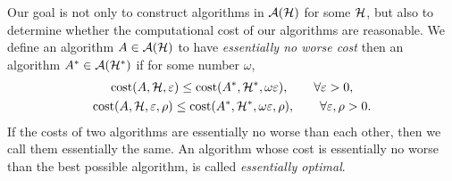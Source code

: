 \documentclass[graybox,footinfo]{svmult}
\begin{document}
Our goal is not only to construct algorithms in ${\mathcal{A}}({\mathcal{H}})$ for some ${\mathcal{H}}$, but also to determine whether the computational cost of our algorithms are reasonable.  We define an algorithm $A \in {\mathcal{A}}({\mathcal{H}})$ to have \emph{essentially no worse cost} then an algorithm $A^* \in {\mathcal{A}}({\mathcal{H}}^*)$ if for some number $\omega$,
\begin{gather}
\textup{cost}(A,{\mathcal{H}},\varepsilon) \le \textup{cost}(A^*,{\mathcal{H}}^*,\omega\varepsilon), \qquad \forall \varepsilon > 0, \\
\textup{cost}(A,{\mathcal{H}},\varepsilon,\rho) \le \textup{cost}(A^*,{\mathcal{H}}^*,\omega\varepsilon,\rho), \qquad \forall \varepsilon,\rho > 0.
\end{gather}
If the costs of two algorithms are essentially no worse than each other, then we call them essentially the same.  An algorithm whose cost is essentially no worse than the best possible algorithm, is called \emph{essentially optimal}.
\end{document}
